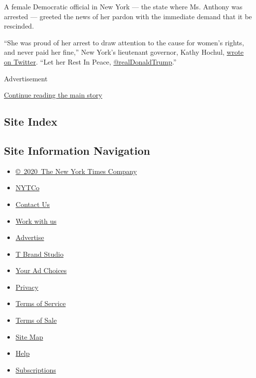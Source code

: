 A female Democratic official in New York --- the state where Ms. Anthony
was arrested --- greeted the news of her pardon with the immediate
demand that it be rescinded.

``She was proud of her arrest to draw attention to the cause for women's
rights, and never paid her fine,'' New York's lieutenant governor, Kathy
Hochul,
\href{https://twitter.com/ltgovhochulny/status/1295721863340077082?s=21}{wrote
on Twitter}. ``Let her Rest In Peace,
\href{https://slack-redir.net/link?url=https\%3A\%2F\%2Ftwitter.com\%2FrealDonaldTrump}{@realDonaldTrump}.''

Advertisement

\protect\hyperlink{after-bottom}{Continue reading the main story}

\hypertarget{site-index}{%
\subsection{Site Index}\label{site-index}}

\hypertarget{site-information-navigation}{%
\subsection{Site Information
Navigation}\label{site-information-navigation}}

\begin{itemize}
\tightlist
\item
  \href{https://help.nytimes3xbfgragh.onion/hc/en-us/articles/115014792127-Copyright-notice}{©~2020~The
  New York Times Company}
\end{itemize}

\begin{itemize}
\tightlist
\item
  \href{https://www.nytco.com/}{NYTCo}
\item
  \href{https://help.nytimes3xbfgragh.onion/hc/en-us/articles/115015385887-Contact-Us}{Contact
  Us}
\item
  \href{https://www.nytco.com/careers/}{Work with us}
\item
  \href{https://nytmediakit.com/}{Advertise}
\item
  \href{http://www.tbrandstudio.com/}{T Brand Studio}
\item
  \href{https://www.nytimes3xbfgragh.onion/privacy/cookie-policy\#how-do-i-manage-trackers}{Your
  Ad Choices}
\item
  \href{https://www.nytimes3xbfgragh.onion/privacy}{Privacy}
\item
  \href{https://help.nytimes3xbfgragh.onion/hc/en-us/articles/115014893428-Terms-of-service}{Terms
  of Service}
\item
  \href{https://help.nytimes3xbfgragh.onion/hc/en-us/articles/115014893968-Terms-of-sale}{Terms
  of Sale}
\item
  \href{https://spiderbites.nytimes3xbfgragh.onion}{Site Map}
\item
  \href{https://help.nytimes3xbfgragh.onion/hc/en-us}{Help}
\item
  \href{https://www.nytimes3xbfgragh.onion/subscription?campaignId=37WXW}{Subscriptions}
\end{itemize}
